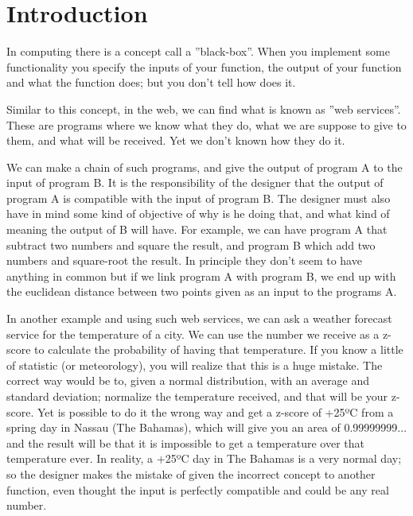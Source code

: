 \documentclass[a4paper,10pt]{article}
\begin{document}
\newpage

\section{Introduction}

In computing there is a concept call a ''black-box''. When you implement some functionality you specify the inputs of your function, the output of your function and what the function does; but you don't tell how does it.\vspace{3 mm}

Similar to this concept, in the web, we can find what is known as ''web services''. These are programs where we know what they do, what we are suppose to give to them, and what will be received. Yet we don't known how they do it.\vspace{3 mm}

We can make a chain of such programs, and give the output of program A to the input of program B. It is the responsibility of the designer that the output of program A is compatible with the input of program B. The designer must also have in mind some kind of objective of why is he doing that, and what kind of meaning the output of B will have. For example, we can have program A that subtract two numbers and square the result, and program B which add two numbers and square-root the result. In principle they don't seem to have anything in common but if we link program A with program B, we end up with the euclidean distance between two points given as an input to the programs A.\vspace{3 mm}

In another example and using such web services, we can ask a weather forecast service for the temperature of a city. We can use the number we receive as a z-score to calculate the probability of having that temperature. If you know a little of statistic (or meteorology), you will realize that this is a huge mistake. The correct way would be to, given a normal distribution, with an average and standard deviation; normalize the temperature received, and that will be your z-score. Yet is possible to do it the wrong way and get a z-score of +25ºC from a spring day in Nassau (The Bahamas), which will give you an area of 0.99999999... and the result will be that it is impossible to get a temperature over that temperature ever. In reality, a +25ºC day in The Bahamas is a very normal day; so the designer makes the mistake of given the incorrect concept to another function, even thought the input is perfectly compatible and could be any real number.\vspace{3 mm}
\end{document}

